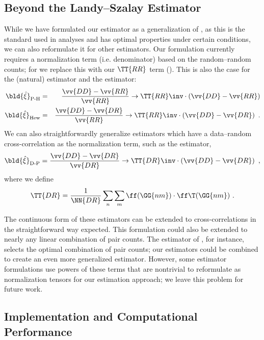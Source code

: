 \subsection{Beyond the Landy--Szalay Estimator}
\label{sec:beyondls}

While we have formulated our estimator as a generalization of \LS, as this is the standard used in \cf analyses and has optimal properties under certain conditions, we can also reformulate it for other estimators.
Our formulation currently requires a normalization term (i.e. denominator) based on the random--random counts; for \LS we replace this with our $\TT{RR}$ term ().
This is also the case for the \cite{PeeblesHauser1974} (natural) estimator and the \cite{Hewett1982} estimator:
\begin{eqnarray}
    \bld{\hat{\xi}}_\text{P-H} &=& \frac{\vv{DD} - \vv{RR}}{\vv{RR}} \rightarrow \TT{RR}\inv \cdot \left( \vv{DD} - \vv{RR} \right)\\
    \bld{\hat{\xi}}_\text{Hew} &=& \frac{\vv{DD} - \vv{DR}}{\vv{RR}} \rightarrow \TT{RR}\inv \cdot \left( \vv{DD} - \vv{DR} \right) ~.
\end{eqnarray}
We can also straightforwardly generalize estimators which have a data--random cross-correlation as the normalization term, such as the \cite{DavisPeebles1983} estimator,
\begin{equation}
    \bld{\hat{\xi}}_\text{D-P} = \frac{\vv{DD} - \vv{DR}}{\vv{DR}} \rightarrow \TT{DR}\inv \cdot \left( \vv{DD} - \vv{DR} \right) ~,
\end{equation}
where we define
\begin{equation}
    \TT{DR} = \frac{1}{\NN{DR}} \sum_{n} \sum_{m} \ff(\GG{n m}) \cdot \ff\T(\GG{n m}) ~.
\end{equation}

The continuous form of these estimators can be extended to cross-correlations in the straightforward way expected.
This formulation could also be extended to nearly any linear combination of pair counts.
The estimator of \cite{VargasMagana2013}, for instance, selects the optimal combination of pair counts; our estimators could be combined to create an even more generalized estimator.
However, some estimator formulations use powers of these terms that are nontrivial to reformulate as normalization tensors for our estimation approach; we leave this problem for future work.

\subsection{Implementation and Computational Performance}
\label{sec:comp}

